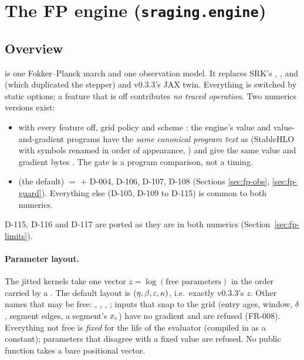 \providecommand{\todo}[1]{{\color{opencol}[\textbf{TODO:} #1]}}
\newcommand{\ulp}{u}
\newcommand{\Fabs}{F}

\section{The FP engine (\texttt{sraging.engine})}\label{sec:fp}

\subsection{Overview}\label{sec:fp-overview}

 is one Fokker--Planck march and one observation model. It replaces SRK's ,
,  and  (which duplicated the stepper) and
v0.3.3's JAX twin. Everything is switched by static options; a feature that is off contributes \emph{no traced
operation}. Two numerics versions exist:
\begin{itemize}[nosep]
  \item \textbf{} with every feature off, grid policy  and scheme : the
    engine's value and value-and-gradient programs have the \emph{same canonical program text} as
     (StableHLO with symbols renamed in order of appearance,
    ) and give the same value and gradient bytes
    . The gate is a program comparison, not a timing.
  \item \textbf{} (the default) $=$  $+$ D-004, D-106, D-107, D-108 (Sections
    \ref{sec:fp-obs}, \ref{sec:fp-guard}). Everything else (D-105, D-109 to D-115) is common to both numerics.
\end{itemize}
D-115, D-116 and D-117 are ported as they are in both numerics (Section~\ref{sec:fp-limits}).

\paragraph{Parameter layout.} The jitted kernels take one vector $z=\log(\text{free parameters})$ in the order
carried by a  . The default layout is
$(\eta,\beta,\varepsilon,\kappa)$, i.e.\ exactly v0.3.3's $z$. Other names that may be free: ,
, , ; inputs that snap to the grid (entry ages, window, $\delta$, segment
edges, a segment's $x_c$) have no gradient and are refused (FR-008). Everything not free is \emph{fixed} for the
life of the evaluator (compiled in as a constant); parameters that disagree with a fixed value are refused.
No public function takes a bare positional vector.

